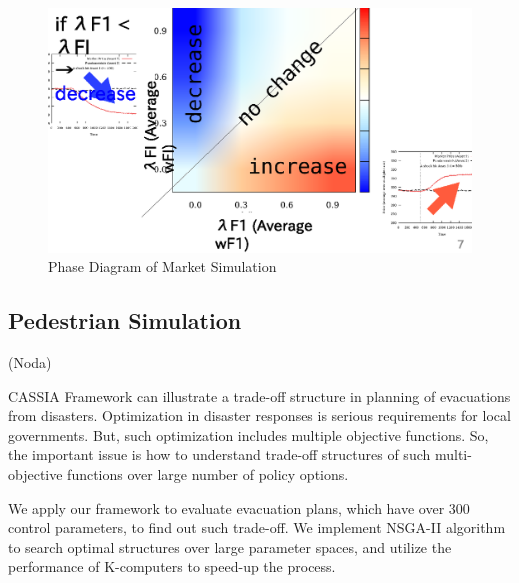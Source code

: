 \begin{figure}
  \centering
  \includegraphics[width=.8\linewidth]{Figs.noda/figure-07.market_phase.eps}
  \caption{Phase Diagram of Market Simulation}
  \label{fig:Figs.noda/figure-07.market_phase.eps}
\end{figure}

\subsection{Pedestrian Simulation}
\label{ss:Pedestrian Simulation}
(Noda)

CASSIA Framework can illustrate a trade-off structure in planning of
evacuations from disasters.  Optimization in disaster responses is
serious requirements for local governments. But, such optimization
includes multiple objective functions.  So, the important issue is how
to understand trade-off structures of such multi-objective functions
over large number of policy options.

We apply our framework to evaluate evacuation plans, which have over
300 control parameters, to find out such trade-off.  We implement
NSGA-II algorithm to search optimal structures over large parameter
spaces, and utilize the performance of K-computers to speed-up the
process.

